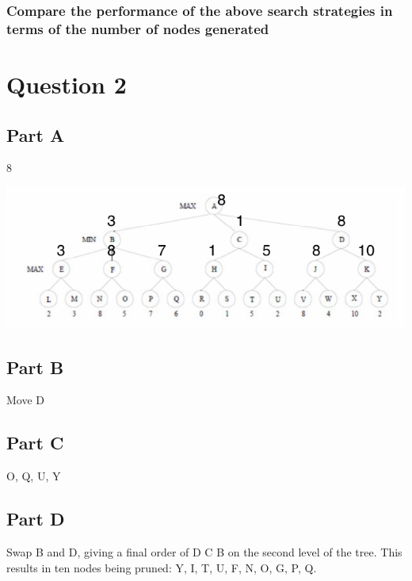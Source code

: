 \documentclass[a4paper]{article}
\begin{document}
\subsubsection{Compare the performance of the above search strategies in terms of the number of nodes generated}

\section{Question 2}



\subsection{Part A}
8
\begin{center}
\includegraphics[width=1\textwidth]{a1q2a.png}
\end{center}

\subsection{Part B}
Move D

\subsection{Part C}
{O, Q, U, Y}

\subsection{Part D}
Swap B and D, giving a final order of {D C B} on the second level of the tree.
This results in ten nodes being pruned: {Y, I, T, U, F, N, O, G, P, Q}.
\end{document}
